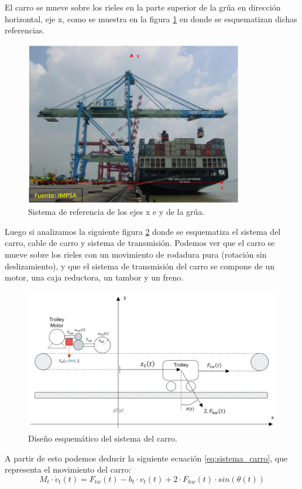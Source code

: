 \documentclass[11pt]{article}
\begin{document}
El carro se mueve sobre los rieles en la parte superior de la grúa en dirección horizontal, eje x, como se muestra en la figura \ref{fig:ref_grua} en donde se esquematizan dichas referencias.

\begin{figure}[h!]
	\centering
	\includegraphics[width=0.85\textwidth]{images/imagen_1_sistema_ref_grua.png}
	\caption{\label{fig:ref_grua} Sistema de referencia de los ejes x e y de la grúa.}
\end{figure}

Luego si analizamos la siguiente figura \ref{fig:sistema_carro} donde se esquematiza el sistema del carro, cable de carro y sistema de transmisión. Podemos ver que el carro se mueve sobre los rieles con un movimiento de rodadura pura (rotación sin deslizamiento), y que el sistema de transmisión del carro se compone de un motor, una caja reductora, un tambor y un freno.

\begin{figure}[h!]
	\centering
	\includegraphics[width=1\textwidth]{images/imagen_2_sistema_carro.png}
	\caption{\label{fig:sistema_carro} Diseño esquemático del sistema del carro.}
\end{figure}
\newpage
A partir de esto podemos deducir la siguiente ecuación \ref{eq:sistema_carro}, que representa el movimiento del carro:
\begin{equation}
	\label{eq:sistema_carro}
	M_{t}\cdot\dot{v}_{t}(t)=F_{tw}(t)-b_{t}\cdot v_{t}(t)+2\cdot F_{hw}(t)\cdot sin(\theta(t))
\end{equation}
\end{document}
